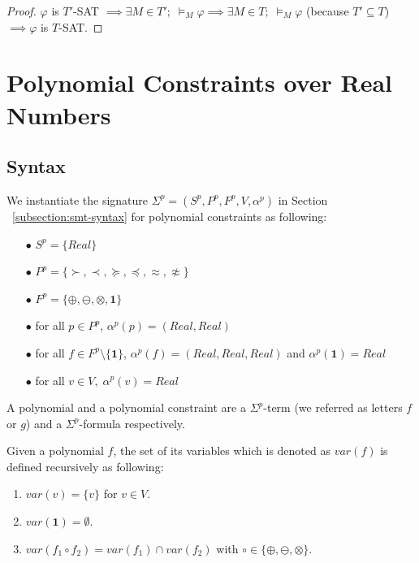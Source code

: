 \begin{proof}
$\varphi$ is $T'$-SAT $\implies \exists M \in T'; \; \models_M \varphi \implies \exists M \in T; \; \models_M \varphi$ (because $T' \subseteq T$) $\implies \varphi$ is $T$-SAT.
\end{proof}

\section{Polynomial Constraints over Real Numbers}
\subsection{Syntax}
We instantiate the signature $\Sigma^p = (S^p, P^p, F^p, V, \alpha^p)$ in Section ~\ref{subsection:smt-syntax} for polynomial constraints as following:
\begin{itemize}
\item[$\bullet$] $S^p = \{Real\}$
\item[$\bullet$] $P^p = \{\succ, \prec, \succeq, \preceq, \approx, \not\approx\}$
\item[$\bullet$] $F^p = \{\oplus, \ominus, \otimes, \mathbf{1}\}$
\item[$\bullet$] for all $p \in P^p$, $\alpha^p(p) = (Real, Real)$
\item[$\bullet$] for all $f \in F^p\setminus \{\mathbf{1}\}$, $\alpha^p(f) = (Real, Real, Real)$ and $\alpha^p(\mathbf{1})=Real$
\item[$\bullet$] for all $v \in V, \; \alpha^p(v) = Real$
\end{itemize}
A polynomial and a polynomial constraint are a $\Sigma^p$-term (we referred as letters $f$ or $g$) and a $\Sigma^p$-formula respectively. 


\begin{definition}
Given a polynomial $f$, the set of its variables which is denoted as $var(f)$ is defined recursively as following:
\begin{enumerate}
\item $var(v) = \{v\}$ for $v \in V$.
\item $var(\mathbf{1}) = \emptyset$.
\item $var(f_1 \circ f_2) = var(f_1) \cap var(f_2)$ with $\circ \in \{\oplus, \ominus, \otimes\}$.
\end{enumerate}
\end{definition}

